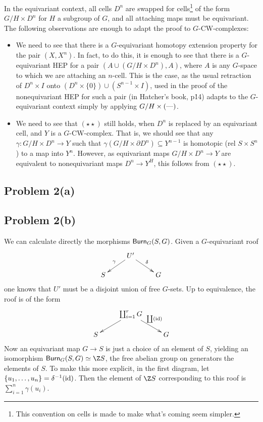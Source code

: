 \documentclass[11pt]{article}
\begin{document}
In the equivariant context, all cells $D^n$ are swapped for cells\footnote{This convention on cells is made to make what's coming seem simpler.} of the form $G/H\times D^n$ for $H$ a subgroup of $G$, and all attaching maps must be equivariant. The following observations are enough to adapt the proof to $G$-CW-complexes:
\begin{itemize}\squishlist
\item We need to see that there is a $G$-equivariant homotopy extension property for the pair $(X,X^n)$. In fact, to do this, it is enough to see that there is a $G$-equivariant HEP for a pair $(A\cup (G/H\times D^n),A)$, where $A$ is any $G$-space to which we are attaching an $n$-cell. This is the case, as the usual retraction of $D^n\times I$ onto $(D^n\times\{0\})\cup(S^{n-1}\times I)$, used in the proof of the nonequivariant HEP for such a pair (in Hatcher's book, p\. 14) adapts to the $G$-equivariant context simply by applying $G/H\times(\textup{---})$.
\item We need to see that $(\star\star)$ still holds, when $D^n$ is replaced by an equivariant cell, and $Y$ is a $G$-CW-complex. That is, we should see that any $\gamma:G/H\times D^n\to Y$ such that $\gamma(G/H\times\partial D^n)\subseteq Y^{n-1}$ is homotopic (rel $S\times S^n$) to a map into $Y^n$. However, as equivariant maps $G/H\times D^n\to Y$ are equivalent to nonequivariant maps $D^n\to Y^H$, this follows from $(\star\star)$.
\end{itemize}
\subsection*{Problem 2(a)}
\subsection*{Problem 2(b)} We can calculate directly the morphisms $\operatorname{{\mathsf{Burn}}}_G(S,G)$. Given a $G$-equivariant roof
\[\xymatrix@R=5mm{&U'\ar[dl]_\gamma\ar[dr]^\delta\\S&&G}\]
one knows that $U'$ must be a disjoint union of free $G$-sets. Up to equivalence, the roof is of the form
\[\xymatrix@R=5mm{&\coprod_{i=1}^rG\ar[dl]\ar[dr]^{\coprod(\id)}\\S&&G}\]
Now an equivariant map $G\to S$ is just a choice of an element of $S$, yielding an isomorphism $\Burnside_G(S,G)\simeq\Z S$, the free abelian group on generators the elements of $S$. To make this more explicit, in the first diagram, let $\{u_1,\ldots, u_n\}=\delta^{-1}(\textup{id})$. Then the element of $\Z S$ corresponding to this roof is $\sum_{i=1}^n\gamma(u_i)$.
\end{document}
